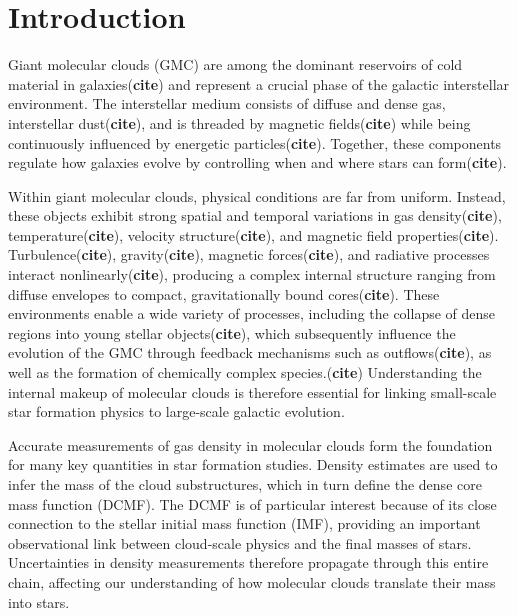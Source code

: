 \documentclass{aa}
\begin{document}

   \maketitle

\section{Introduction}

   Giant molecular clouds (GMC) are among the dominant reservoirs of cold material in galaxies(\textbf{cite}) and represent a crucial phase of the galactic interstellar environment.
   The interstellar medium consists of diffuse and dense gas, interstellar dust(\textbf{cite}), and is threaded by magnetic fields(\textbf{cite}) while being continuously influenced by energetic particles(\textbf{cite}).
   Together, these components regulate how galaxies evolve by controlling when and where stars can form(\textbf{cite}).

   Within giant molecular clouds, physical conditions are far from uniform. Instead, these objects exhibit strong spatial and temporal variations in gas density(\textbf{cite}), temperature(\textbf{cite}), velocity structure(\textbf{cite}), and magnetic field properties(\textbf{cite}).
   Turbulence(\textbf{cite}), gravity(\textbf{cite}), magnetic forces(\textbf{cite}), and radiative processes interact nonlinearly(\textbf{cite}), producing a complex internal structure ranging from diffuse envelopes to compact, gravitationally bound cores(\textbf{cite}).
   These environments enable a wide variety of processes, including the collapse of dense regions into young stellar objects(\textbf{cite}), which subsequently influence the evolution of the GMC through feedback mechanisms such as outflows(\textbf{cite}), as well as the formation of chemically complex species.(\textbf{cite})
   Understanding the internal makeup of molecular clouds is therefore essential for linking small-scale star formation physics to large-scale galactic evolution. 


   Accurate measurements of gas density in molecular clouds form the foundation for many key quantities in star formation studies.
   Density estimates are used to infer the mass of the cloud substructures, which in turn define the dense core mass function (DCMF).
   The DCMF is of particular interest because of its close connection to the stellar initial mass function (IMF), providing an important observational link between cloud-scale physics and the final masses of stars.
   Uncertainties in density measurements therefore propagate through this entire chain, affecting our understanding of how molecular clouds translate their mass into stars.
\end{document}
